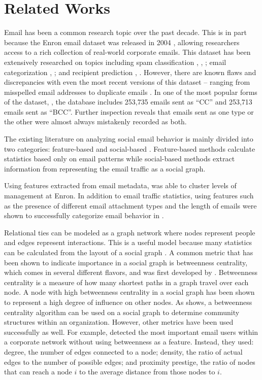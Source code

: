\documentclass{article}
\begin{document}
\section{Related Works} \label{Related Works}
Email has been a common research topic over the past decade.  This is in part because  the Enron email dataset was released in 2004 \cite{klimt_introducing_2004}, allowing researchers access to a rich collection of real-world corporate emails.  This dataset has been extensively researched on topics including spam classification \cite{martin_analyzing_2005}, \cite{gaber_e-mail_2016}, \cite{shams_classifying_2013}; email categorization \cite{he_novel_2014}, \cite{keila_structure_2005}; and recipient prediction \cite{sofershtein_predicting_2015}, \cite{hu_towards_2012}.  However, there are known flaws and discrepancies with even the most recent versions of this dataset -- ranging from misspelled email addresses \cite{nordbo_data_2014} to duplicate emails \cite{waterman_big_2014}. In one of the most popular forms of the dataset, \cite{shetty_enron_2004}, the database includes 253,735 emails sent as ``CC'' and  253,713 emails sent as ``BCC''.  Further inspection reveals that emails sent as one type or the other were almost always mistakenly recorded as both.
\par
The existing literature on analyzing social email behavior is mainly divided into two categories: feature-based and social-based \cite{tang_email_2013}.  Feature-based methods calculate statistics based only on email patterns while social-based methods extract information from representing the email traffic as a social graph.
\par
Using features extracted from email metadata, \cite{yelupula_social_2008} was able to cluster levels of management at Enron. In addition to email traffic statistics, using features such as the presence of different email attachment types and the length of emails were shown to successfully categorize email behavior in \cite{martin_analyzing_2005}.
\par
Relational ties can be modeled as a graph network where nodes represent people and edges represent interactions.  This is a useful model because many statistics can be calculated from the layout of a social graph \cite{wasserman_social_1994}.  A common metric that has been shown to indicate importance in a social graph is betweenness centrality, which comes in several different flavors, and was first developed by \cite{freeman_set_1977}.  Betweenness centrality is a measure of how many shortest paths in a graph travel over each node.  A node with high betweenness centrality in a social graph has been shown to represent a high degree of influence on other nodes.  As \cite{tyler_email_2003} shows, a betweenness centrality algorithm can be used on a social graph to determine community structures within an organization.  However, other metrics have been used successfully as well.  For example, \cite{wilson_discovery_2009} detected the most important email users within a corporate network without using betweenness as a feature.  Instead, they used: degree, the number of edges connected to a node; density, the ratio of actual edges to the number of possible edges; and proximity prestige, the ratio of nodes that can reach a node $i$ to the average distance from those nodes to $i$.
\end{document}
